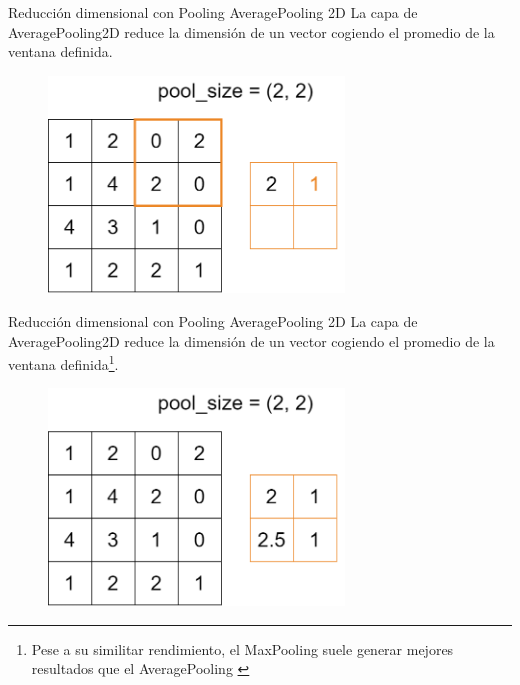 \begin{frame}{Reducción dimensional con Pooling}
\alert{\Large AveragePooling 2D}
La capa de AveragePooling2D reduce la dimensión de un vector cogiendo el \alert{promedio} de la ventana definida.

\begin{figure}
    \centering
    \includegraphics[width=0.7\textwidth]{Slides/figures/Tema 3/AvgPooling_2.png}
\end{figure}
\end{frame}

\begin{frame}{Reducción dimensional con Pooling}
\alert{\Large AveragePooling 2D}
La capa de AveragePooling2D reduce la dimensión de un vector cogiendo el \alert{promedio} de la ventana definida\footnote{Pese a su similitar rendimiento, el MaxPooling suele generar mejores resultados que el AveragePooling \cite{bieder2021comparison}}.

\begin{figure}
    \centering
    \includegraphics[width=0.7\textwidth]{Slides/figures/Tema 3/AvgPooling_res.png}
\end{figure}
\end{frame}

